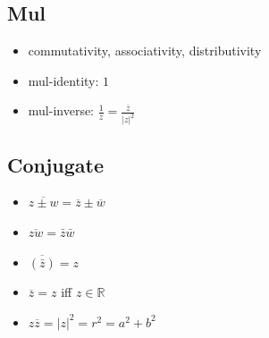 	\subsection{Mul}
		\begin{definition}[$zw=rse^{i(\theta+\varphi)}$]
			\begin{itemize}
				\item commutativity, associativity, distributivity
				\item mul-identity: $1$
				\item mul-inverse: $\displaystyle\frac1z=\frac{\overline z}{|z|^2}$
			\end{itemize}
		\end{definition}
	\subsection{Conjugate}    
		\begin{definition}[$\overline z=a-bi$]
			 \begin{itemize}
				\item $\overline{z\pm w}=\overline z\pm\overline w$ 
				\item $\overline{zw}=\bar z\bar w$
				\item $\overline{(\bar z)}=z$
				\item $\overline z=z$ iff $z\in\mathbb{R}$
				\item $z\overline z=|z|^2=r^2=a^2+b^2$
			 \end{itemize}
		\end{definition}
